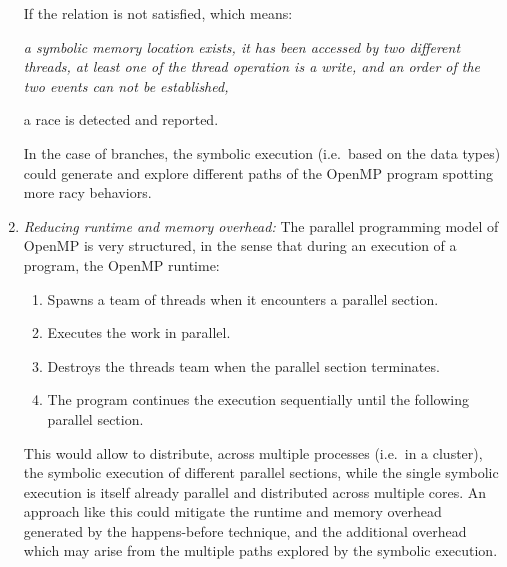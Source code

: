 \begin{refsection}
\begin{enumerate}
  If the relation is not satisfied, which means:
  \begin{blockquote}
    \emph{a symbolic memory location exists, it has been accessed
    by two different threads, at least one of the thread operation is a
    write, and an order of the two events can not be established,}
  \end{blockquote}
  a race is detected and reported.

  In the case of branches, the symbolic execution (i.e.\ based on the data
  types) could generate and explore different paths of the OpenMP program
  spotting more racy behaviors.
\item \emph{Reducing runtime and memory overhead:} The parallel programming
  model of OpenMP is very structured, in the sense that during an execution of
  a program, the OpenMP runtime:
  \begin{enumerate}
  \item Spawns a team of threads when it encounters a parallel section.
  \item Executes the work in parallel.
  \item Destroys the threads team when the parallel section terminates.
  \item The program continues the execution sequentially until the following
    parallel section.
  \end{enumerate}
  This would allow to distribute, across multiple processes (i.e.\ in a
  cluster), the symbolic execution of different parallel sections, while the
  single symbolic execution is itself already parallel and distributed across
  multiple cores.
  An approach like this could mitigate the runtime and memory overhead
  generated by the happens-before technique, and the additional overhead which
  may arise from the multiple paths explored by the symbolic execution.
\end{enumerate}

\printbibliography

\end{refsection}

